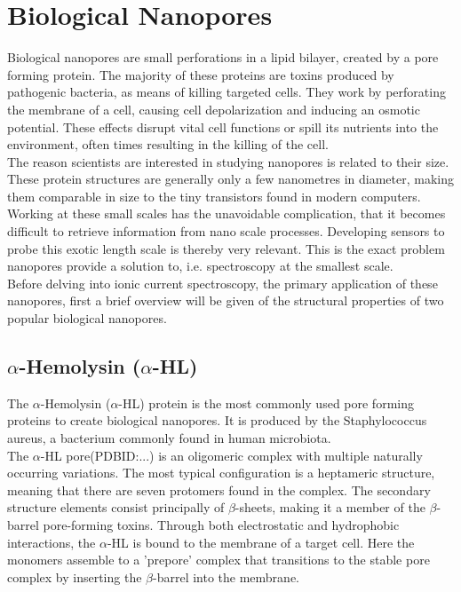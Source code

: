 \section{Biological Nanopores}

Biological nanopores are small perforations in a lipid bilayer, created
by a pore forming protein.  The majority of these proteins are toxins produced by
pathogenic bacteria, as means of killing targeted cells. They work by perforating the
membrane of a cell, causing cell depolarization and inducing an osmotic potential.
These effects disrupt vital cell functions or spill its nutrients into the
environment, often times resulting in the killing of the cell.\\

The reason scientists are interested in studying nanopores is related to their size.
These protein structures are generally only a few nanometres in diameter, making them
comparable in size to the tiny transistors found in modern computers.
Working at these small scales has the unavoidable complication, that it becomes difficult
to retrieve information from nano scale processes.
Developing sensors to probe this exotic length scale is thereby very relevant. This is
the exact problem nanopores provide a solution to, i.e. spectroscopy at the smallest
scale.\\

Before delving into ionic current spectroscopy, the primary application of these
nanopores, first a brief overview will be given of the structural properties of two
popular biological nanopores.

\subsection{$\alpha$-Hemolysin ($\alpha$-HL)}

The $\alpha$-Hemolysin ($\alpha$-HL) protein is the most commonly used pore forming
proteins to create biological nanopores. It is produced by the Staphylococcus aureus, a
bacterium commonly found in human microbiota.\\

The $\alpha$-HL pore(PDBID:...) is an oligomeric complex with multiple naturally
occurring variations. The most typical configuration
is a heptameric structure, meaning that there are seven protomers found in the complex.
The secondary structure elements consist principally of $\beta$-sheets, making it a
member
of the $\beta$-barrel pore-forming toxins. Through both electrostatic and hydrophobic
interactions, the $\alpha$-HL is bound to the membrane of a target cell. Here the
monomers assemble to a 'prepore' complex that transitions to the stable pore complex by
inserting the $\beta$-barrel into the membrane.\\

